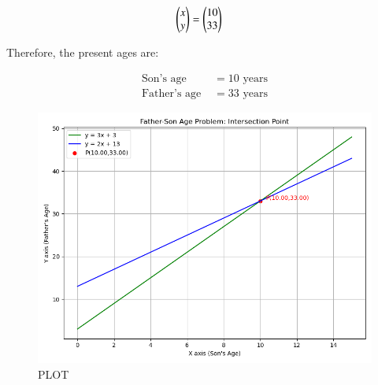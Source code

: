 \documentclass[journal,12pt,onecolumn]{IEEEtran}
\theoremstyle{remark}
\begin{document}
\begin{align}
\begin{pmatrix}x\\y\end{pmatrix} &= \begin{pmatrix}10\\33\end{pmatrix}
\end{align}

Therefore, the present ages are:

\begin{align*}
\text{Son's age } &= 10 \text{ years} \\
\text{Father's age } &= 33 \text{ years}
\end{align*}
\pagebreak
\begin{figure}[H]
    \centering
    \includegraphics[width=0.7\columnwidth]{figs/Figure_1.png}
    \caption{PLOT}
    \label{fig:placeholder}
\end{figure}
\end{document}
